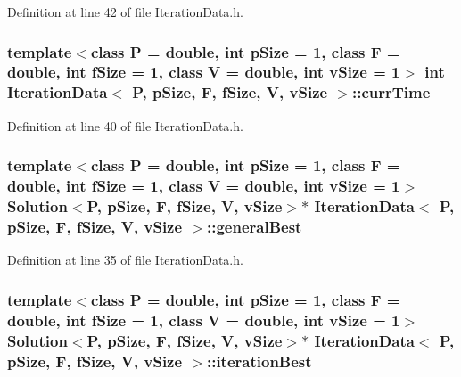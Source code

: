 Definition at line 42 of file Iteration\+Data.\+h.

\subsubsection[{\texorpdfstring{curr\+Time}{currTime}}]{\setlength{\rightskip}{0pt plus 5cm}template$<$class P = double, int p\+Size = 1, class F = double, int f\+Size = 1, class V = double, int v\+Size = 1$>$ int {\bf Iteration\+Data}$<$ P, p\+Size, F, f\+Size, V, v\+Size $>$\+::curr\+Time}\hypertarget{structIterationData_ade4c00fea568ba6547b46d39da98ca95}{}\label{structIterationData_ade4c00fea568ba6547b46d39da98ca95}


Definition at line 40 of file Iteration\+Data.\+h.

\subsubsection[{\texorpdfstring{general\+Best}{generalBest}}]{\setlength{\rightskip}{0pt plus 5cm}template$<$class P = double, int p\+Size = 1, class F = double, int f\+Size = 1, class V = double, int v\+Size = 1$>$ {\bf Solution}$<$P, p\+Size, F, f\+Size, V, v\+Size$>$$\ast$ {\bf Iteration\+Data}$<$ P, p\+Size, F, f\+Size, V, v\+Size $>$\+::general\+Best}\hypertarget{structIterationData_a537b9ef402a8f1f5a0e7f017e698e61b}{}\label{structIterationData_a537b9ef402a8f1f5a0e7f017e698e61b}


Definition at line 35 of file Iteration\+Data.\+h.

\subsubsection[{\texorpdfstring{iteration\+Best}{iterationBest}}]{\setlength{\rightskip}{0pt plus 5cm}template$<$class P = double, int p\+Size = 1, class F = double, int f\+Size = 1, class V = double, int v\+Size = 1$>$ {\bf Solution}$<$P, p\+Size, F, f\+Size, V, v\+Size$>$$\ast$ {\bf Iteration\+Data}$<$ P, p\+Size, F, f\+Size, V, v\+Size $>$\+::iteration\+Best}\hypertarget{structIterationData_a2fd9659d2ca4c7df24c31bb01c261704}{}\label{structIterationData_a2fd9659d2ca4c7df24c31bb01c261704}


